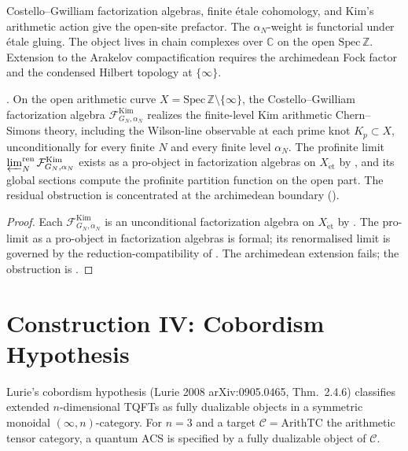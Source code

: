 Costello--Gwilliam factorization algebras, finite \'etale cohomology,
and Kim's arithmetic action give the open-site prefactor. The
\(\alpha_N\)-weight is functorial under \'etale gluing. The object
lives in chain complexes over \(\mathbb C\) on the open
\(\mathrm{Spec}\,\mathbb Z\). Extension to the Arakelov compactification
requires the archimedean Fock factor and the condensed Hilbert
topology at \(\{\infty\}\).

\begin{theorem}
\label{v4-arith:w10-a:thm:construction-III-closure}
\ClaimStatusProvedHere. On the open arithmetic curve
\(X=\mathrm{Spec}\,\mathbb{Z}\setminus\{\infty\}\), the
Costello--Gwilliam factorization algebra
\(\mathcal F^{\mathrm{Kim}}_{G_{N},\alpha_{N}}\) realizes the
finite-level Kim arithmetic Chern--Simons theory, including the
Wilson-line observable at each prime knot \(K_{p}\subset X\),
unconditionally for every finite \(N\) and every finite level
\(\alpha_{N}\). The profinite limit
\(\varprojlim_{N}^{\mathrm{ren}}\mathcal F^{\mathrm{Kim}}_{G_{N},\alpha_{N}}\)
exists as a pro-object in factorization algebras on \(X_{\mathrm{\acute et}}\)
by , and its global
sections compute the profinite partition function on the open
part. The residual obstruction is concentrated at the archimedean
boundary ().
\end{theorem}

\begin{proof}
Each \(\mathcal F^{\mathrm{Kim}}_{G_{N},\alpha_{N}}\) is an
unconditional factorization algebra on \(X_{\mathrm{\acute et}}\) by
. The pro-limit as a pro-object
in factorization algebras is formal; its renormalised limit is
governed by the reduction-compatibility of
. The archimedean
extension fails; the obstruction is
.
\end{proof}

\section{Construction IV: Cobordism Hypothesis}
\label{v4-arith:w10-a:construction-IV}

Lurie's cobordism hypothesis (Lurie 2008 arXiv:0905.0465, Thm.~2.4.6)
classifies extended \(n\)-dimensional TQFTs as fully dualizable
objects in a symmetric monoidal \((\infty,n)\)-category. For
\(n=3\) and a target
\(\mathcal{C}=\mathrm{ArithTC}\) the arithmetic tensor category, a
quantum ACS is specified by a fully dualizable object of \(\mathcal{C}\).

